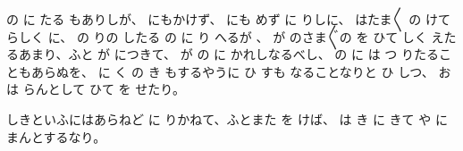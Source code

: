 の
に
たる
もありしが、
にもかけず、
にも
めず
に
りしに、
はたま〳〵
の
けて
らしく
に、
の
りの
したる
の
に
り
へるが
、
が
のさま〴〵の
を
ひて
しく
えたるあまり、ふと
が
につきて、
が
の
に
かれしなるべし、
の
に
は
つ
りたることもあらぬを、
に
く
の
き
もするやうに
ひ
すも
なることなりと
ひ
しつ、
お
は
らんとして
ひて
を
せたり。

しきといふにはあらねど
に
りかねて、ふとまた
を
けば、
は
き
に
きて
や
に
まんとするなり。

